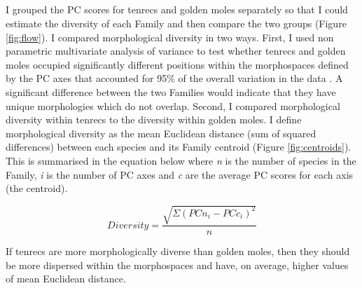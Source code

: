 \subsection{}
	
	I grouped the PC scores for tenrecs and golden moles separately so that I could estimate the diversity of each Family and then compare the two groups (Figure \ref{fig:flow}). I compared morphological diversity in two ways. First, I used non parametric multivariate analysis of variance \citep[npMANOVA;][]{Anderson2001} to test whether tenrecs and golden moles occupied significantly different positions within the morphospaces defined by the PC axes that accounted for 95\% of the overall variation in the data \citep[e.g.][]{Serb2011, Ruta2013}. A significant difference between the two Families would indicate that they have unique morphologies which do not overlap. Second, I compared morphological diversity within tenrecs to the diversity within golden moles. I define morphological diversity as the mean Euclidean distance (sum of squared differences) between each species and its Family centroid (Figure \ref{fig:centroids}). This is summarised in the equation below where \textit{n} is the number of species in the Family, \textit{i} is the number of PC axes and \textit{c} are the average PC scores for each axis (the centroid). 
	
	\begin{equation}
	Diversity = \frac{\sqrt{\Sigma(PCn_{i}-PCc_{i})^2}}{n}
	\end{equation}

	
	
	If tenrecs are more morphologically diverse than golden moles, then they should be more dispersed within the morphospaces and have, on average, higher values of mean Euclidean distance. 
	

